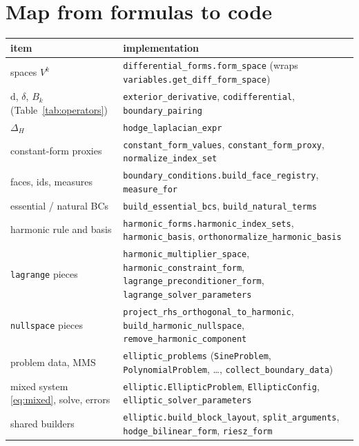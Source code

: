 \documentclass[11pt]{article}
\newcommand{\dd}{\mathrm{d}}
\newcommand{\cod}{\delta}
\newcommand{\code}[1]{\texttt{#1}}
\theoremstyle{remark}
\begin{document}
\section{Map from formulas to code}\label{sec:code}

\begin{center}
\renewcommand{\arraystretch}{1.15}
\begin{tabular}{@{}>{\raggedright}p{}>{\raggedright\arraybackslash}p{}@{}}
\toprule
item & implementation\\
\midrule
spaces $V^k$ & \code{differential\_forms.form\_space} (wraps \code{variables.get\_diff\_form\_space})\\
$\dd$, $\cod$, $B_k$ (Table~\ref{tab:operators}) & \code{exterior\_derivative}, \code{codifferential}, \code{boundary\_pairing}\\
$\Delta_H$ & \code{hodge\_laplacian\_expr}\\
constant-form proxies & \code{constant\_form\_values}, \code{constant\_form\_proxy}, \code{normalize\_index\_set}\\
faces, ids, measures & \code{boundary\_conditions.build\_face\_registry}, \code{measure\_for}\\
essential / natural BCs & \code{build\_essential\_bcs}, \code{build\_natural\_terms}\\
harmonic rule and basis & \code{harmonic\_forms.harmonic\_index\_sets}, \code{harmonic\_basis}, \code{orthonormalize\_harmonic\_basis}\\
\code{lagrange} pieces & \code{harmonic\_multiplier\_space}, \code{harmonic\_constraint\_form}, \code{lagrange\_preconditioner\_form}, \code{lagrange\_solver\_parameters}\\
\code{nullspace} pieces & \code{project\_rhs\_orthogonal\_to\_harmonic}, \code{build\_harmonic\_nullspace}, \code{remove\_harmonic\_component}\\
problem data, MMS & \code{elliptic\_problems} (\code{SineProblem}, \code{PolynomialProblem}, \dots, \code{collect\_boundary\_data})\\
mixed system \eqref{eq:mixed}, solve, errors & \code{elliptic.EllipticProblem}, \code{EllipticConfig}, \code{elliptic\_solver\_parameters}\\
shared builders & \code{elliptic.build\_block\_layout}, \code{split\_arguments}, \code{hodge\_bilinear\_form}, \code{riesz\_form}\\

\end{tabular}
\end{center}
\end{document}
